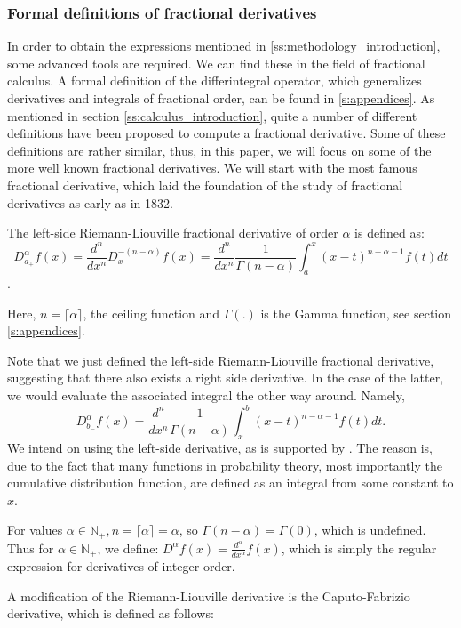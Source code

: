 \subsubsection{Formal definitions of fractional derivatives}
In order to obtain the expressions mentioned in \ref{ss:methodology_introduction}, some advanced tools are required. We can find these in the field of fractional calculus. A formal definition of the differintegral operator, which generalizes derivatives and integrals of fractional order, can be found in \ref{s:appendices}. As mentioned in section \ref{ss:calculus_introduction}, quite a number of different definitions have been proposed to compute a fractional derivative. Some of these definitions are rather similar, thus, in this paper, we will focus on some of the more well known fractional derivatives. We will start with the most famous fractional derivative, which laid the foundation of the study of fractional derivatives as early as in 1832.
\begin{definition}
    The left-side Riemann-Liouville fractional derivative of order \(\alpha\) is defined as:
    \begin{equation}
        D^{\alpha}_{a_+} f(x) =  \frac{d^{n}}{dx^{n}} D_{x}^{-(n - \alpha)} f(x) = \frac{d^n}{dx^n} \frac{1}{\Gamma(n -\alpha)}  \int_{a}^{x} (x-t)^{n - \alpha-1} f(t) dt
    \end{equation} \cite{liouville1832}.

    Here, \(n = \lceil \alpha \rceil\), the ceiling function and \(\Gamma(.)\) is the Gamma function, see section \autoref{s:appendices}.

    Note that we just defined the left-side Riemann-Liouville fractional derivative, suggesting that there also exists a right side derivative. In the case of the latter, we would evaluate the associated integral the other way around. Namely, \[D^{\alpha}_{b_-} f(x) = \frac{d^n}{dx^n} \frac{1}{\Gamma(n -\alpha)}  \int_{x}^{b} (x-t)^{n - \alpha-1} f(t) dt.\] We intend on using the left-side derivative, as is supported by \cite{tarasov2023}. The reason is, due to the fact that many functions in probability theory, most importantly the cumulative distribution function, are defined as an integral from some constant to \(x\). 
    
    \begin{remark}\label{r: integer}
        For values \(\alpha \in \mathbb{N}_+, n =  \lceil \alpha \rceil = \alpha\), so \(\Gamma(n - \alpha) = \Gamma(0)\), which is undefined. Thus for \(\alpha \in \mathbb{N}_+\), we define: \(D^\alpha f(x) = \frac{d^\alpha}{dx^\alpha} f(x)\), which is simply the regular expression for derivatives of integer order.
    \end{remark}
   
\end{definition}
A modification of the Riemann-Liouville derivative is the Caputo-Fabrizio derivative, which is defined as follows:

